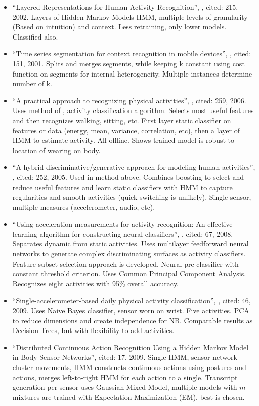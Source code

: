 \begin{itemize}
  \item ``Layered Representations for Human Activity Recognition'', \cite{oliver2002layered}, cited: 215, 2002. Layers of Hidden Markov Models HMM, multiple levels of granularity (Based on intuition) and context. Less retraining, only lower models. Classified also.
  \item ``Time series segmentation for context recognition in mobile devices'', \cite{himberg2001time}, cited: 151, 2001. Splits and merges segments, while keeping k constant using cost function on segments for internal heterogeneity. Multiple instances determine number of k.
  \item ``A practical approach to recognizing physical activities'', \cite{lester2006practical}, cited: 259, 2006. Uses method of \cite{lester2005hybrid}, activity classification algorithm. Selects most useful features and then recognizes walking, sitting, etc. First layer static classifier on features or data (energy, mean, variance, correlation, etc), then a layer of HMM to estimate activity. All offline. Shows trained model is robust to location of wearing on body.
  \item ``A hybrid discriminative/generative approach for modeling human activities'', \cite{lester2005hybrid}, cited: 252, 2005. Used in method above. Combines boosting to select and reduce useful features and learn static classifiers with HMM to capture regularities and smooth activities (quick switching is unlikely). Single sensor, multiple measures (accelerometer, audio, etc).
  \item ``Using acceleration measurements for activity recognition: An effective learning algorithm for constructing neural classifiers'', \cite{yang2008using}, cited: 67, 2008. Separates dynamic from static activities. Uses multilayer feedforward neural networks to generate complex discriminating surfaces as activity classifiers. Feature subset selection approach is developed. Neural pre-classifier with constant threshold criterion. Uses Common Principal Component Analysis. Recognizes eight activities with 95\% overall accuracy.
  \item ``Single-accelerometer-based daily physical activity classification'', \cite{long2009single}, cited: 46, 2009. Uses Naive Bayes classifier, sensor worn on wrist. Five activities. PCA to reduce dimensions and create independence for NB. Comparable results as Decision Trees, but with flexibility to add activities.
  \item ``Distributed Continuous Action Recognition Using a Hidden Markov Model in Body Sensor Networks'', cited: 17, 2009. Single HMM, sensor network cluster movements, HMM constructs continuous actions using postures and actions, merges left-to-right HMM for each action to a single. Transcript generation per sensor uses Gaussian Mixed Model, multiple models with $m$ mixtures are trained with Expectation-Maximization (EM), best is chosen.

\end{itemize}
